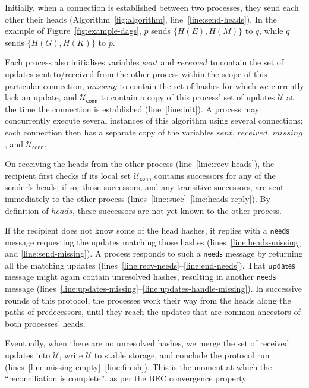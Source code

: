 \documentclass[a4paper,anonymous,USenglish]{lipics-v2019}
\begin{document}
Initially, when a connection is established between two processes, they send each other their heads (Algorithm~\ref{fig:algorithm}, line~\ref{line:send-heads}).
In the example of Figure~\ref{fig:example-dags}, $p$ sends $\{H(E),H(M)\}$ to $q$, while $q$ sends $\{H(G),H(K)\}$ to $p$.

Each process also initialises variables $\mathit{sent}$ and $\mathit{received}$ to contain the set of updates sent to/received from the other process within the scope of this particular connection, $\mathit{missing}$ to contain the set of hashes for which we currently lack an update, and $\mathcal{U}_\mathsf{conn}$ to contain a copy of this process' set of updates $\mathcal{U}$ at the time the connection is established (line~\ref{line:init}).
A process may concurrently execute several instances of this algorithm using several connections; each connection then has a separate copy of the variables $\mathit{sent}$, $\mathit{received}$, $\mathit{missing}$, and $\mathcal{U}_\mathsf{conn}$.

On receiving the heads from the other process (line~\ref{line:recv-heads}), the recipient first checks if its local set $\mathcal{U}_\mathsf{conn}$ contains successors for any of the sender's heads; if so, those successors, and any transitive successors, are sent immediately to the other process (lines~\ref{line:succ}--\ref{line:heads-reply}).
By definition of $\mathit{heads}$, these successors are not yet known to the other process.

If the recipient does not know some of the head hashes, it replies with a $\mathsf{needs}$ message requesting the updates matching those hashes (lines~\ref{line:heads-missing} and \ref{line:send-missing}).
A process responds to such a $\mathsf{needs}$ message by returning all the matching updates (lines~\ref{line:recv-needs}--\ref{line:end-needs}).
That $\mathsf{updates}$ message might again contain unresolved hashes, resulting in another $\mathsf{needs}$ message (lines~\ref{line:updates-missing}--\ref{line:updates-handle-missing}).
In successive rounds of this protocol, the processes work their way from the heads along the paths of predecessors, until they reach the updates that are common ancestors of both processes' heads.

Eventually, when there are no unresolved hashes, we merge the set of received updates into $\mathcal{U}$, write $\mathcal{U}$ to stable storage, and conclude the protocol run (lines~\ref{line:missing-empty}--\ref{line:finish}).
This is the moment at which the ``reconciliation is complete'', as per the BEC convergence property.
\end{document}
